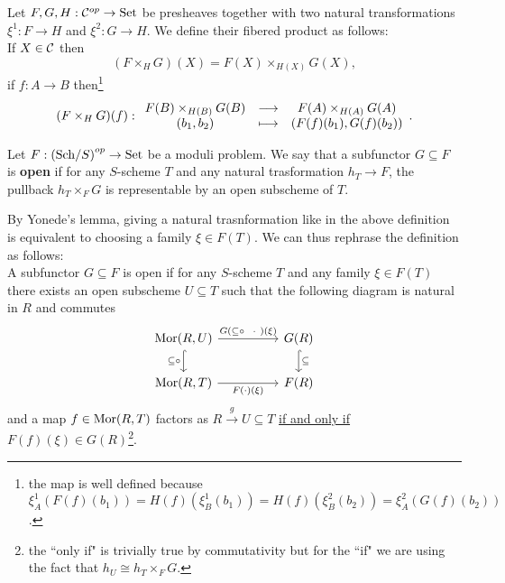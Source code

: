 \begin{definition}
Let $F,G,H:\mathcal{C}^{op}\to\mathrm{Set}$ be presheaves together with two natural transformations $\xi^1:F\to H$ and $\xi^2:G\to H$. We define their fibered product as follows:\\
If $X\in\mathcal{C}$ then 
\[(F\times_H G)(X)=F(X)\times_{H(X)}G(X),\] 
if $f:A\to B$ then\footnote{the map is well defined because $\xi^1_A(F(f)(b_1))=H(f)(\xi^1_B(b_1))=H(f)(\xi^2_B(b_2))=\xi^2_A(G(f)(b_2))$.}
\[(F\times_HG)(f):\begin{array}{ccc} {F(B)\times_{H(B)}G(B)} & \longrightarrow & {F(A)\times_{H(A)}G(A)}\\ {(b_1,b_2)} & \longmapsto & {(F(f)(b_1),G(f)(b_2))} \end{array}.\]
\end{definition}
\begin{definition}
Let $F:\left({\mathrm{Sch}}/{S}\right)^{op}\to \mathrm{Set}$ be a moduli problem. We say that a subfunctor $G\subseteq F$ is \textbf{open} if for any $S$-scheme $T$ and any natural trasformation $h_T\to F$, the pullback $h_T\times_FG$ is representable by an open subscheme of $T$.
\end{definition}

\begin{remark}
By Yonede's lemma, giving a natural trasnformation like in the above definition is equivalent to choosing a family $\xi\in F(T)$. We can thus rephrase the definition as follows:\\
A subfunctor $G\subseteq F$ is open if for any $S$-scheme $T$ and any family $\xi\in F(T)$ there exists an open subscheme $U\subseteq T$ such that the following diagram is natural in $R$ and commutes
\[\begin{tikzcd}
	{\Mor(R,U)} && {G(R)} \\
	{\Mor(R,T)} && {F(R)}
	\arrow["\subseteq\circ"', hook, from=1-1, to=2-1]
	\arrow["{G(\subseteq \circ ~~\cdot~)(\xi)}", from=1-1, to=1-3]
	\arrow["{F(\cdot)(\xi)}"', from=2-1, to=2-3]
	\arrow["\subseteq", hook, from=1-3, to=2-3]
\end{tikzcd}\]
and a map $f\in \mathrm{Mor}(R,T)$ factors as $R\overset g\to U\subseteq T$ \underline{if and only if} $F(f)(\xi)\in G(R)$\footnote{the ``only if" is trivially true by commutativity but for the ``if" we are using the fact that $h_U\cong h_T\times_FG$.}.
\end{remark}